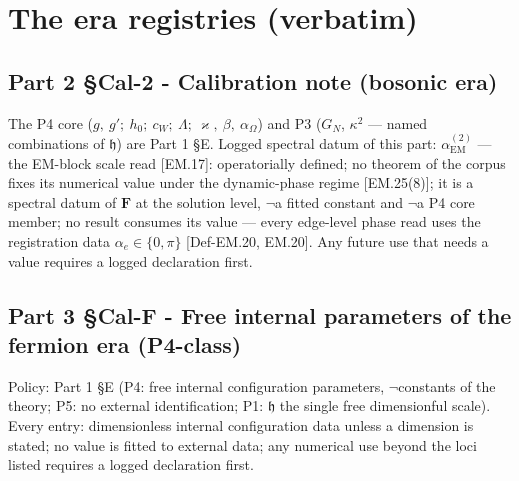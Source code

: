 \documentclass[11pt,openany]{report}
\theoremstyle{canonplain}
\theoremstyle{canondef}
\begin{document}
\section*{\texorpdfstring{The era registries (verbatim)}{The era registries (verbatim)}}
\subsection*{Part 2 §Cal-2 - Calibration note (bosonic era)}
The P4 core ($g,\ g';\ h_0;\ c_W;\ \Lambda;\ \varkappa,\ \beta,\ \alpha_\Omega$) and P3 ($G_N$, $\kappa^2$ — named combinations of $\mathfrak h$) are Part 1 §E. Logged spectral datum of this part: $\alpha_{\mathrm{EM}}^{(2)}$ — the EM-block scale read [EM.17]: operatorially defined; no theorem of the corpus fixes its numerical value under the dynamic-phase regime [EM.25(8)]; it is a spectral datum of $\mathbf F$ at the solution level, $\neg$a fitted constant and $\neg$a P4 core member; no result consumes its value — every edge-level phase read uses the registration data $\alpha_e\in\{0,\pi\}$ [Def-EM.20, EM.20]. Any future use that needs a value requires a logged declaration first.

\subsection*{Part 3 §Cal-F - Free internal parameters of the fermion era (P4-class)}
Policy: Part 1 §E (P4: free internal configuration parameters, $\neg$constants of the theory; P5: no external identification; P1: $\mathfrak h$ the single free dimensionful scale). Every entry: dimensionless internal configuration data unless a dimension is stated; no value is fitted to external data; any numerical use beyond the loci listed requires a logged declaration first.
\end{document}
